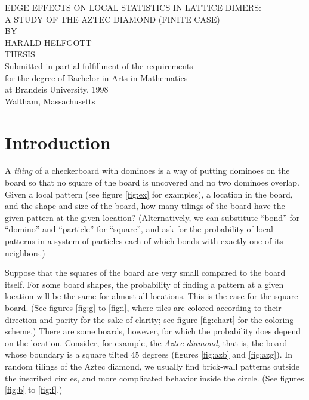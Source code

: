 \documentclass[10pt,reqno]{amsart}
\theoremstyle{plain}
\theoremstyle{definition}
\theoremstyle{remark}
\begin{document}
\begin{titlepage}

    \begin{center}
    \vspace*{1.325in}
    EDGE EFFECTS ON LOCAL STATISTICS IN LATTICE DIMERS:\\
    A STUDY OF THE AZTEC DIAMOND (FINITE CASE)\\
    \vspace{1.365626in}
    BY\\
    
    \vspace{.2in}
    HARALD HELFGOTT\\
    \vspace{1.11875in}
    THESIS\\
    \vspace{.2in} 
    Submitted in partial fulfillment of the requirements\\
    for the degree of Bachelor in Arts in Mathematics\\
    at Brandeis University, 1998\\
    \vspace{1.19750in}
    Waltham, Massachusetts
    \end{center}
    \end{titlepage}
    \address{Mathematics Department \\
      Brandeis University
      Waltham, MA 02254-9110}
    \section{Introduction}

    A {\em tiling} of a checkerboard with dominoes is a way of putting dominoes
    on the board so that no square of the board is uncovered and no two dominoes
    overlap.  Given a local pattern (see figure \ref{fig:ex} for examples), a 
    location in the board, and the shape and size of the board, how many tilings
    of the board have the given pattern at the given location? (Alternatively,
    we can substitute ``bond'' for ``domino'' and ``particle'' for 
    ``square'', and ask for the probability of local patterns in a system
    of particles each of which bonds with exactly one of its neighbors.)
    
    Suppose that the squares of the board are very small compared to the
    board itself. For some board shapes, the probability of finding a pattern
    at a given location will be the same for almost all locations. This is
    the case for the square board. (See figures \ref{fig:g} to \ref{fig:i},
    where tiles are colored according to their direction and parity for
    the sake of clarity; see figure \ref{fig:chart} for the coloring scheme.)
    There are some boards, however, for which the probability does depend
    on the location. Consider, for example, the {\em Aztec diamond}, that is,
    the board whose boundary is a square tilted $45$ degrees 
    (figures \ref{fig:azb} and \ref{fig:azg}). 
    In random tilings of the Aztec diamond, we usually find brick-wall patterns 
    outside the inscribed circles, and more complicated behavior inside
    the circle. (See figures \ref{fig:b} to \ref{fig:f}.)
    
\end{document}
